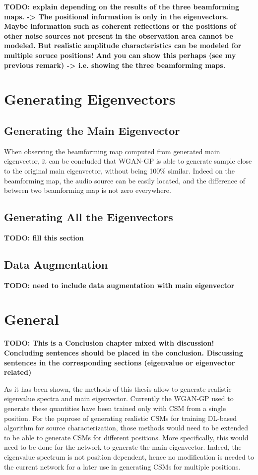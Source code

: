 \documentclass[11pt,a4paper,twoside]{report}
\begin{document}
\textbf{TODO: explain depending on the results of the three beamforming maps. ->  The positional information is only in the eigenvectors. Maybe information such as coherent reflections or the positions of other noise sources not present in the observation area cannot be modeled. But realistic amplitude characteristics can be modeled for multiple soruce positions! And you can show this perhaps (see my previous remark) -> i.e. showing the three beamforming maps.}

\section{Generating Eigenvectors}

\subsection{Generating the Main Eigenvector}

When observing the beamforming map computed from generated main eigenvector, it can be concluded that WGAN-GP is able to generate sample close to the original main eigenvector, without being 100\% similar. Indeed on the beamforming map, the audio source can be easily located, and the difference of between two beamforming map is not zero everywhere.

\subsection{Generating All the Eigenvectors}

\textbf{TODO: fill this section}

\subsection{Data Augmentation}

\textbf{TODO: need to include data augmentation with main eigenvector}


\section{General}

\textbf{TODO: This is a Conclusion chapter mixed with discussion! Concluding sentences should be placed in the conclusion. Discussing sentences in the corresponding sections (eigenvalue or eigenvector related)}

As it has been shown, the methods of this thesis allow to generate realistic eigenvalue spectra and main eigenvector. Currently the WGAN-GP used to generate these quantities have been trained only with CSM from a single position. For the puprose of generating realistic CSMs for training DL-based algorithm for source characterization, those methods would need to be extended to be able to generate CSMs for different positions. More specifically, this would need to be done for the network to generate the main eigenvector. Indeed, the eigenvalue spectrum is not position dependent, hence no modification is needed to the current network for a later use in generating CSMs for multiple positions.
\end{document}
